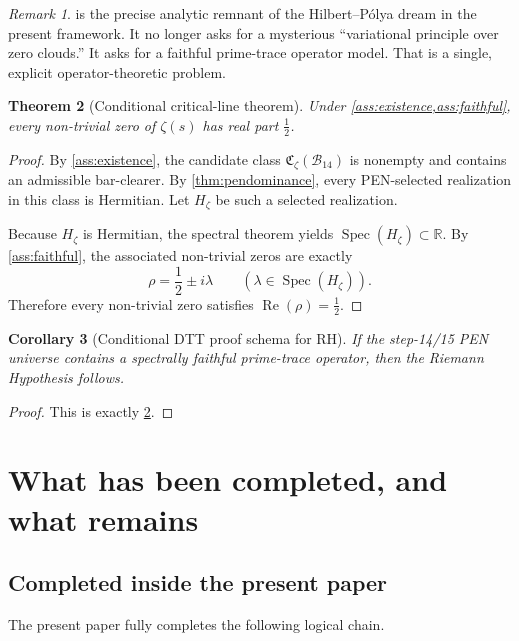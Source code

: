 \documentclass[11pt,a4paper]{article}
\theoremstyle{plain}
\newtheorem{theorem}{Theorem}[section]
\newtheorem{corollary}[theorem]{Corollary}
\theoremstyle{definition}
\theoremstyle{remark}
\newtheorem{remark}[theorem]{Remark}
\newcommand{\R}{\mathbb{R}}
\newcommand{\Bcal}{\mathcal{B}}
\newcommand{\Spec}{\operatorname{Spec}}
\newcommand{\Rea}{\operatorname{Re}}
\begin{document}
\begin{remark}
 is the precise analytic remnant of the Hilbert--P\'olya dream in the present framework. It no longer asks for a mysterious ``variational principle over zero clouds.'' It asks for a faithful prime-trace operator model. That is a single, explicit operator-theoretic problem.
\end{remark}

\begin{theorem}[Conditional critical-line theorem]
\label{thm:conditionalrh}
Under \cref{ass:existence,ass:faithful}, every non-trivial zero of $\zeta(s)$ has real part $\tfrac12$.
\end{theorem}

\begin{proof}
By \cref{ass:existence}, the candidate class $\mathfrak C_{\zeta}(\Bcal_{14})$ is nonempty and contains an admissible bar-clearer. By \cref{thm:pendominance}, every PEN-selected realization in this class is Hermitian. Let $H_\zeta$ be such a selected realization.

Because $H_\zeta$ is Hermitian, the spectral theorem yields $\Spec(H_\zeta)\subset\R$. By \cref{ass:faithful}, the associated non-trivial zeros are exactly
\[
\rho = \frac12 \pm i\lambda
\qquad (\lambda\in\Spec(H_\zeta)).
\]
Therefore every non-trivial zero satisfies $\Rea(\rho)=\tfrac12$.
\end{proof}

\begin{corollary}[Conditional DTT proof schema for RH]
If the step-14/15 PEN universe contains a spectrally faithful prime-trace operator, then the Riemann Hypothesis follows.
\end{corollary}

\begin{proof}
This is exactly \cref{thm:conditionalrh}.
\end{proof}

\section{What has been completed, and what remains}

\subsection{Completed inside the present paper}

The present paper fully completes the following logical chain.
\end{document}
